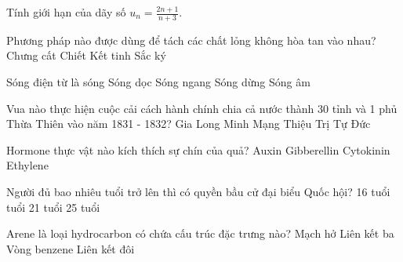 \begin{ex}
    Tính giới hạn của dãy số $u_n = \frac{2n+1}{n+3}$.
\end{ex}
\begin{ex}
    Phương pháp nào được dùng để tách các chất lỏng không hòa tan vào nhau?
    \choice
    {Chưng cất}
    {\True Chiết}
    {Kết tinh}
    {Sắc ký}

\end{ex}
\begin{ex}
    Sóng điện từ là sóng
    \choice
    {Sóng dọc}
    {\True Sóng ngang}
    {Sóng dừng}
    {Sóng âm}

\end{ex}
\begin{ex}
    Vua nào thực hiện cuộc cải cách hành chính chia cả nước thành 30 tỉnh và 1 phủ Thừa Thiên vào năm 1831 - 1832?
    \choice
    {Gia Long}
    {\True Minh Mạng}
    {Thiệu Trị}
    {Tự Đức}

\end{ex}
\begin{ex}
    Hormone thực vật nào kích thích sự chín của quả?
    \choice
    {Auxin}
    {Gibberellin}
    {Cytokinin}
    {\True Ethylene}

\end{ex}
\begin{ex}
    Người đủ bao nhiêu tuổi trở lên thì có quyền bầu cử đại biểu Quốc hội?
    \choice
    {16 tuổi}
    { tuổi}
    {21 tuổi}
    {25 tuổi}

\end{ex}
\begin{ex}
    Arene là loại hydrocarbon có chứa cấu trúc đặc trưng nào?
    \choice
    {Mạch hở}
    {Liên kết ba}
    {\True Vòng benzene}
    {Liên kết đôi}

\end{ex}
